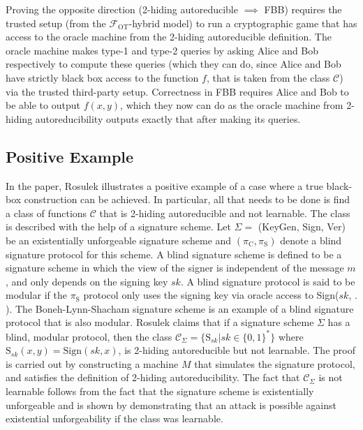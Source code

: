 \documentclass[11pt]{article}
\theoremstyle{theorem}
\theoremstyle{theorem}
\theoremstyle{remark}
\theoremstyle{note}
\theoremstyle{plain}
\theoremstyle{definition}
\begin{document}
Proving the opposite direction (2-hiding autoreducible $\implies$ FBB) requires the trusted setup (from the $\mathcal{F}_\text{OT}$-hybrid model) to run a cryptographic game that has access to the oracle machine from the 2-hiding autoreducible definition. The oracle machine makes type-1 and type-2 queries by asking Alice and Bob respectively to compute these queries (which they can do, since Alice and Bob have strictly black box access to the function $f$, that is taken from the class $\mathcal{C}$) via the trusted third-party setup. Correctness in FBB requires Alice and Bob to be able to output $f(x,y)$, which they now can do as the oracle machine from 2-hiding autoreducibility outputs exactly that after making its queries.

\subsection{Positive Example}
In the paper, Rosulek illustrates a positive example of a case where a true black-box construction can be achieved. In particular, all that needs to be done is find a class of functions $\mathcal{C}$ that is 2-hiding autoreducible and not learnable. The class is described with the help of a signature scheme. Let $\Sigma = $ (KeyGen, Sign, Ver) be an existentially unforgeable signature scheme and $(\pi_\text{C}, \pi_\text{S})$ denote a blind signature protocol for this scheme. A blind signature scheme is defined to be a signature scheme in which the view of the signer is independent of the message $m$, and only depends on the signing key $sk$. A blind signature protocol is said to be modular if the $\pi_\text{S}$ protocol only uses the signing key via oracle access to Sign($sk$, $.$ ). The Boneh-Lynn-Shacham signature scheme \cite{JC:BonLynSha04} is an example of a blind signature protocol that is also modular. Rosulek claims that if a signature scheme $\Sigma$ has a blind, modular protocol, then the class $\mathcal{C}_\Sigma = \{ \text{S}_{sk} | sk \in \{0, 1\}^* \}$ where $\text{S}_{sk} (x, y) = \text{Sign} (sk, x)$, is 2-hiding autoreducible but not learnable. The proof is carried out by constructing a machine $M$ that simulates the signature protocol, and satisfies the definition of 2-hiding autoreducibility. The fact that $\mathcal{C}_\Sigma$ is not learnable follows from the fact that the signature scheme is existentially unforgeable and is shown by demonstrating that an attack is possible against existential unforgeability if the class was learnable.
\end{document}
